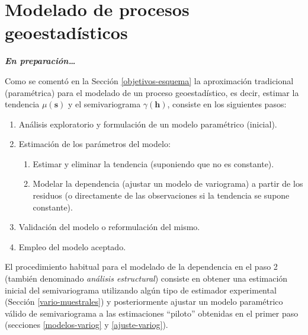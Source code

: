 \documentclass[
  spanish,
]{book}
\theoremstyle{break}
\theoremstyle{definition}
\theoremstyle{definition}
\theoremstyle{definition}
\theoremstyle{definition}
\theoremstyle{remark}
\begin{document}
\hypertarget{modelado}{%
\chapter{Modelado de procesos geoestadísticos}\label{modelado}}

\textbf{\emph{En preparación\ldots{}}}

Como se comentó en la Sección \ref{objetivos-esquema} la aproximación tradicional (paramétrica) para el modelado de un proceso geoestadístico, es decir, estimar la tendencia \(\mu(\mathbf{s})\) y el semivariograma \(\gamma(\mathbf{h})\), consiste en los siguientes pasos:

\begin{enumerate}
\def\labelenumi{\arabic{enumi}.}
\item
  Análisis exploratorio y formulación de un modelo paramétrico (inicial).
\item
  Estimación de los parámetros del modelo:

  \begin{enumerate}
  \def\labelenumii{\arabic{enumii}.}
  \item
    Estimar y eliminar la tendencia (suponiendo que no es constante).
  \item
    Modelar la dependencia (ajustar un modelo de variograma) a partir de los residuos
    (o directamente de las observaciones si la tendencia se supone constante).
  \end{enumerate}
\item
  Validación del modelo o reformulación del mismo.
\item
  Empleo del modelo aceptado.
\end{enumerate}

El procedimiento habitual para el modelado de la dependencia en el paso 2 (también denominado \emph{análisis estructural}) consiste en obtener una estimación inicial del semivariograma utilizando algún tipo de estimador experimental (Sección \ref{vario-muestrales}) y posteriormente ajustar un modelo paramétrico válido de semivariograma a las estimaciones ``piloto'' obtenidas en el primer paso (secciones \ref{modelos-variog} y \ref{ajuste-variog}).
\end{document}
